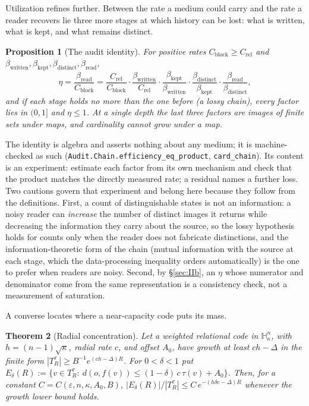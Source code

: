 \documentclass[11pt,reqno]{amsart}
\theoremstyle{plain}
\newtheorem{theorem}{Theorem}[section]
\newtheorem{proposition}[theorem]{Proposition}
\theoremstyle{definition}
\newcommand{\Crel}{C_{\mathrm{rel}}}
\newcommand{\Cblock}{C_{\mathrm{block}}}
\newcommand{\Hk}{\mathbb{H}^n_\kappa}
\newcommand{\eps}{\varepsilon}
\begin{document}
Utilization refines further. Between the rate a medium could carry and the rate a reader recovers lie three more stages at which history can be lost: what is written, what is kept, and what remains distinct.

\begin{proposition}[The audit identity]\label{prop:audit}
For positive rates $\Cblock\ge\Crel$ and $\beta_{\mathrm{written}},\beta_{\mathrm{kept}},\beta_{\mathrm{distinct}},\beta_{\mathrm{read}}$,
\[
\eta=\frac{\beta_{\mathrm{read}}}{\Cblock}
=\frac{\Crel}{\Cblock}\cdot\frac{\beta_{\mathrm{written}}}{\Crel}\cdot\frac{\beta_{\mathrm{kept}}}{\beta_{\mathrm{written}}}\cdot\frac{\beta_{\mathrm{distinct}}}{\beta_{\mathrm{kept}}}\cdot\frac{\beta_{\mathrm{read}}}{\beta_{\mathrm{distinct}}},
\]
and if each stage holds no more than the one before (a \emph{lossy} chain), every factor lies in $(0,1]$ and $\eta\le1$. At a single depth the last three factors are images of finite sets under maps, and cardinality cannot grow under a map.
\end{proposition}

The identity is algebra and asserts nothing about any medium; it is machine-checked as such (\texttt{Audit.Chain.efficiency\_\allowbreak{}eq\_\allowbreak{}product}, \texttt{card\_\allowbreak{}chain}). Its content is an experiment: estimate each factor from its own mechanism and check that the product matches the directly measured rate; a residual names a further loss. Two cautions govern that experiment and belong here because they follow from the definitions. First, a count of distinguishable states is not an information: a noisy reader can \emph{increase} the number of distinct images it returns while decreasing the information they carry about the source, so the lossy hypothesis holds for counts only when the reader does not fabricate distinctions, and the information-theoretic form of the chain (mutual information with the source at each stage, which the data-processing inequality orders automatically) is the one to prefer when readers are noisy. Second, by \S\ref{sec:IIb}, an $\eta$ whose numerator and denominator come from the same representation is a consistency check, not a measurement of saturation.

A converse locates where a near-capacity code puts its mass.

\begin{theorem}[Radial concentration]\label{thm:radial}
Let a weighted relational code in $\Hk$, with $h=(n-1)\sqrt\kappa$, radial rate $c$, and offset $A_0$, have growth at least $ch-\Delta$ in the finite form $|T_R^\tau|\ge B^{-1}e^{(ch-\Delta)R}$. For $0<\delta<1$ put $E_\delta(R):=\{v\in T_R^\tau:\ d(o,f(v))\le(1-\delta)\,c\,\tau(v)+A_0\}$. Then, for a constant $C=C(\eps,n,\kappa,A_0,B)$, $|E_\delta(R)|/|T_R^\tau|\le C\,e^{-(h\delta c-\Delta)R}$ whenever the growth lower bound holds.
\end{theorem}
\end{document}
